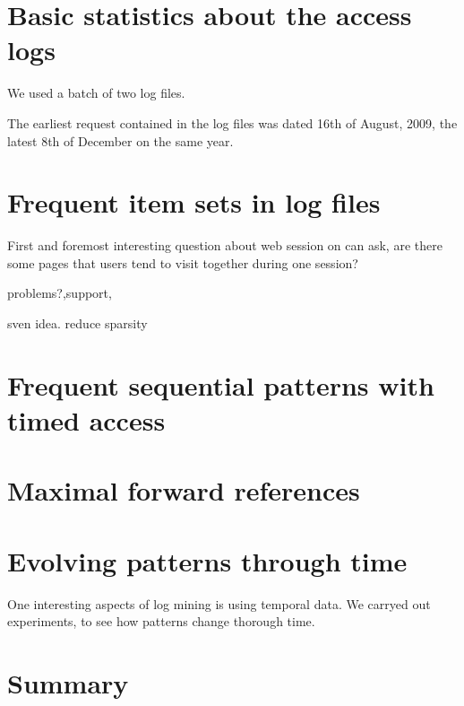 \documentclass{article}
\begin{document}
\section{Basic statistics about the access logs} We used a batch of two log
files.

The earliest request contained in the log files was dated 16th of August,
2009, the latest 8th of December on the same year.

\section{Frequent item sets in log files} First and foremost interesting
question about web session on can ask, are there some pages that users tend to
visit together during one session?

problems?,support,

sven idea. reduce sparsity

\section{Frequent sequential patterns with timed access}

\section{Maximal forward references}

\section{Evolving patterns through time} One interesting aspects of log mining
is using temporal data. We carryed out experiments, to see how patterns change
thorough time.

\section{Summary}
\end{document}
